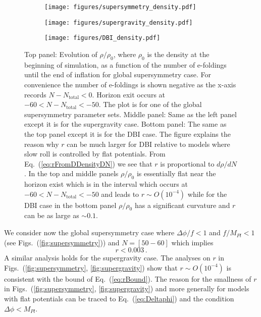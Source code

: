 \documentclass[12pt]{article}
\begin{document}
\begin{figure}
  \centering
  \begin{subfigure}{0.5 \textwidth}
    \texttt{[image: figures/supersymmetry\_density.pdf]}
  \end{subfigure}
  \begin{subfigure}{0.5 \textwidth}
    \texttt{[image: figures/supergravity\_density.pdf]}
  \end{subfigure}
  \begin{subfigure}{0.5 \textwidth}
    \texttt{[image: figures/DBI\_density.pdf]}
  \end{subfigure}
  \caption{
    Top panel: Evolution of $\rho / \rho_0$, where $\rho_0$ is the density at the beginning of simulation, as a function of the number of e-foldings until the end of inflation for global supersymmetry case.
    For convenience the number of e-foldings is shown negative as the x-axis records $N - N_\text{total} < 0$.
    Horizon exit occurs at $-60 < N - N_\text{total} < -50$.
    The plot is for one of the global supersymmetry parameter sets.
    Middle panel: Same as the left panel except it is for the supergravity case.
    Bottom panel: The same as the top panel except it is for the DBI case.
    The figure explains the reason why $r$ can be much larger for DBI relative to models where slow roll is controlled by flat potentials.
    From Eq.~(\ref{eq:rFromDDensityDN}) we see that $r$ is proportional to $d\rho / dN$.
    In the top and middle panels $\rho / \rho_0$ is essentially flat near the horizon exist which is in the interval which occurs at $-60 < N - N_\text{total} < -50$ and leads to $r \sim O\left(10^{-4}\right)$ while for the DBI case in the bottom panel $\rho / \rho_0$ has a significant curvature and $r$ can be as large as $\sim 0.1$.
  } \label{fig:density}
\end{figure}
We consider now the global supersymmetry case where $\Delta\phi / f < 1$ and $f / M_{Pl} < 1$ (see Figs.~(\ref{fig:supersymmetry})) and $N = \left[50 - 60\right]$ which implies
\begin{equation} \label{eq:rBound}
  r < 0.003\,.
\end{equation}
A similar analysis holds for the supergravity case.
The analyses on $r$ in Figs.~(\ref{fig:supersymmetry}, \ref{fig:supergravity}) show that $r \sim O\left(10^{-4}\right)$ is consistent with the bound of Eq.~(\ref{eq:rBound}).
The reason for the smallness of $r$ in Figs.~(\ref{fig:supersymmetry}, \ref{fig:supergravity}) and more generally for models with flat potentials can be traced to Eq.~(\ref{eq:Deltaphi}) and the condition $\Delta\phi < M_{Pl}$.
\end{document}
